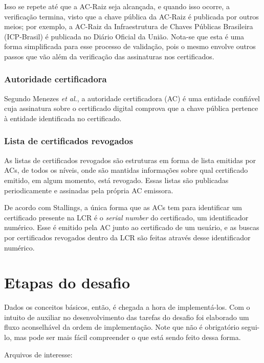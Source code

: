 \documentclass{article}
\begin{document}
Isso se repete até que a AC-Raiz seja alcançada, e quando isso ocorre,
a verificação termina, visto que a chave pública da AC-Raiz é publicada por
outros meios; por exemplo, a AC-Raiz da Infraestrutura de Chaves Públicas
Brasileira (ICP-Brasil) é publicada no Diário Oficial da União. Nota-se que
esta é uma forma simplificada para esse processo de validação, pois o mesmo
envolve outros passos que vão além da verificação das assinaturas nos
certificados.

\subsubsection{Autoridade certificadora}\label{subsubsec:ac}

Segundo Menezes \textit{et al.}, a autoridade certificadora (AC) é uma entidade
confiável cuja assinatura sobre o certificado digital comprova que a chave
pública pertence à entidade identificada no certificado.

\subsubsection{Lista de certificados revogados}\label{subsubsec:crl}

As listas de certificados revogados são estruturas em forma de lista emitidas
por ACs, de todos os níveis, onde são mantidas informações sobre qual
certificado emitido, em algum momento, está revogado. Essas listas são
publicadas periodicamente e assinadas pela própria AC emissora.

De acordo com Stallings, a única forma que as ACs tem para identificar um
certificado presente na LCR é o \textit{serial number} do certificado, um
identificador numérico. Esse é emitido pela AC junto ao certificado de um
usuário, e as buscas por certificados revogados dentro da LCR são feitas
através desse identificador numérico.

\section{Etapas do desafio}\label{sec:steps}

Dados os conceitos básicos, então, é chegada a hora de implementá-los. Com
o intuito de auxiliar no desenvolvimento das tarefas do desafio foi elaborado
um fluxo aconselhável da ordem de implementação. Note que não é obrigatório
segui-lo, mas pode ser mais fácil compreender o que está sendo feito dessa
forma.

Arquivos de interesse:
\end{document}
